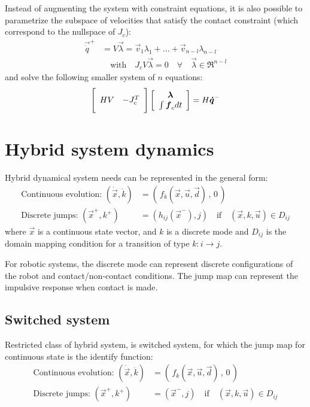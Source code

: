 Instead of augmenting the system with constraint equations,  it is also possible to parametrize the subspace of velocities that satisfy the contact constraint (which correspond to the nullspace of $J_c$):
%
\begin{align}
\vec{\dot{q}}^+ &= V \vec{\lambda} = \vec{v}_1 \lambda_1  + ... + \vec{v}_{n-l} \lambda_{n-l} \\
& \quad \text{with} \quad J_c V \vec{\lambda} = 0 \quad \forall \quad \vec{\lambda} \in \Re^{n-l}
\end{align}
%
and solve the following smaller system of $n$ equations:
%
\begin{align}
\Bigg[ \begin{array}{c c } 	H V & -J_c^T  	\end{array} \Bigg] \left[ \begin{array}{c} \vec{\lambda}  \\ \int{ \vec{f}_c dt }\end{array} \right] = H \vec{\dot{q}}^-
\label{eq:manipulator_impact_eom}
\end{align}


\section{Hybrid system dynamics}

Hybrid dynamical system needs can be represented in the general form:
%
\begin{align}
\text{Continuous evolution: } \left(  \dot{\vec{x}} , \dot{k} \right) &=  \left( \, f_k( \vec{x} , \vec{u} , \vec{d} ) \, , \, 0 \, \right) \\
\text{Discrete jumps: } \left(  \vec{x}^+ , k^+ \right) &=  \left( h_{ij}( \vec{x}^- ) , j \right) \quad\text{if}\quad \left(  \vec{x} , k , \vec{u} \right) \in D_{ij} 
\end{align}
%
where $\vec{x}$ is a continuous state vector, and $k$ is a discrete mode and $D_{ij}$ is the domain mapping condition for a transition of type $k:i \rightarrow j$.

For robotic systems, the discrete mode can represent discrete configurations of the robot and contact/non-contact conditions. The jump map can represent the impulsive response when contact is made.

\subsection{Switched system}

Restricted class of hybrid system, is switched system, for which the jump map for continuous state is the identify function:
%
\begin{align}
\text{Continuous evolution: } \left(  \dot{\vec{x}} , \dot{k} \right) &=  \left( \, f_k( \vec{x} , \vec{u} , \vec{d} ) \, , \, 0 \, \right) \\
\text{Discrete jumps: } \left(  \vec{x}^+ , k^+ \right) &=  \left( \vec{x}^- , j \right) \quad\text{if}\quad \left(  \vec{x} , k , \vec{u} \right) \in D_{ij} 
\end{align}
%

